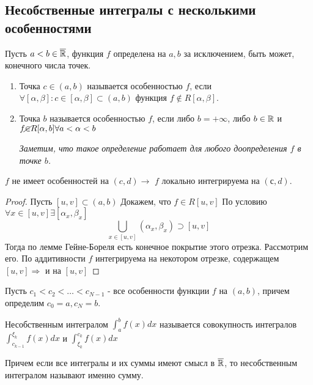 \subsection{Несобственные интегралы с несколькими особенностями}
\begin{definition}
    Пусть \(a < b \in \overline{\mathbb{R}}\), функция \(f\) определена на \(a, b\) за исключением, быть может, конечного числа точек. 
    \begin{enumerate}
        \item Точка \(c \in (a, b)\) называется особенностью \(f\), если \(\forall [\alpha, \beta]: c \in [\alpha, \beta] \subset (a, b)\) функция \(f \notin R[\alpha, \beta]\). 
        
        \item Точка \(b\) называется особенностью \(f\), если либо $b = +\infty$, либо $b \in \mathbb{R}$ и $f \cancel{\in} R[\alpha, b] \forall a < \alpha < b$

        \textit{Заметим, что такое определение работает для любого доопределения $f$ в точке $b$.}
    \end{enumerate}
\end{definition}
    \begin{note}
        $f$ не имеет особенностей на $(c, d) \rightarrow$ $f$ локально интегрируема на $(с, d)$.
    \end{note}
    \begin{proof}
        Пусть $[u,v] \subset (a,b)$
        Докажем, что $f \in R [u,v]$
        По условию $\forall x \in [u,v] \exists [\alpha_x,\beta_x]$
        $$\bigcup_{x \in [u, v]}(\alpha_x, \beta_x) \supset [u, v]$$
        Тогда по лемме Гейне-Бореля есть конечное покрытие этого отрезка. 
        Рассмотрим его.
        По аддитивности $f$ интегрируема на некотором отрезке, содержащем $[u, v] \Rightarrow$ и на $[u, v]$
    \end{proof}
    \begin{definition}
        Пусть $c_1 < c_2 < \dots < c_{N-1} $ - все особенности функции $f$ на $(a, b)$, причем определим \(c_0 = a, c_N = b\).

    \end{definition}

    Несобственным интегралом $\int_{a}^b f(x) dx$ называется совокупность интегралов $\int_{c_{k-1}}^{\xi_k}f(x)dx$ и $\int_{\xi_k}^{c_k} f(x)dx$

    Причем если все интегралы и их суммы имеют смысл в $\overline{\mathbb{R}}$, то несобственным интегралом называют именно сумму.
        
    
        
